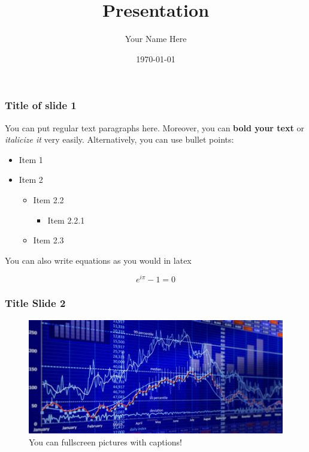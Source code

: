\documentclass{beamer}
\title{Presentation}
\date{\today}
\author{Your Name Here}
\begin{document}
\frame{\titlepage}

\begin{frame}[fragile]
    \frametitle{Title of slide 1}

You can put regular text paragraphs here. Moreover, you can \textbf{bold your text} or \emph{italicize it} very
easily. Alternatively, you can use bullet points:


\begin{itemize}
\item Item 1
\item Item 2

\begin{itemize}
\item Item 2.2

\begin{itemize}
\item Item 2.2.1

\end{itemize}
\item Item 2.3

\end{itemize}

\end{itemize}


You can also write equations as you would in latex

$$
e^{i \pi} - 1 = 0
$$


\end{frame}


\begin{frame}[fragile]
    \frametitle{Title Slide 2}


    \begin{figure}
        \centering
        \includegraphics[width=0.9\paperwidth,height=0.7\paperheight,keepaspectratio]{./figs/stock_image.jpg}
        \caption{You can fullscreen pictures with captions!}
    \end{figure}
\end{frame}
\end{document}
